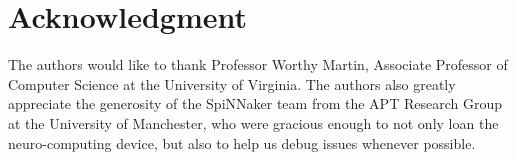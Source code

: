 \documentclass[journal]{./sty/IEEEtran}
\begin{document}
\newpage

\section*{Acknowledgment}


The authors would like to thank Professor Worthy Martin, Associate Professor of Computer Science at the University of Virginia. The authors also greatly appreciate the generosity of the SpiNNaker team from the APT Research Group at the University of Manchester, who were gracious enough to not only loan the neuro-computing device, but also to help us debug issues whenever possible.


\ifCLASSOPTIONcaptionsoff
  \newpage
\fi





%
%
%
\end{document}
